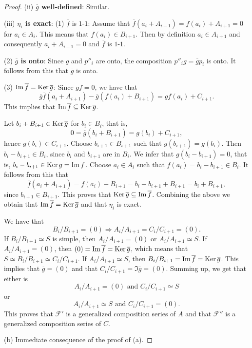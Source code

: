\begin{proof}
(ii) \textbf{$\overline{g}$ well-defined}: Similar.

(iii) \textbf{$\eta_i$ is exact}: (1) $\overline{f}$ is $1$-$1$:
Assume that $\overline{f}(a_i+A_{i+1}) = f(a_i) + A_{i+1} =0$ for
$a_i\in A_i$. This means that $f(a_i)\in B_{i+1}$.  Then by definition
$a_i\in A_{i+1}$ and consequently $a_i+A_{i+1} = 0$ and $\overline{f}$
is $1$-$1$.

(2) \textbf{$\overline{g}$ is onto}: Since $g$ and $p''_i$ are onto,
the composition $p''_ig = \overline{g}p_i$ is onto.  It follows from
this that $\overline{g}$ is onto.

(3) $\operatorname{Im}\nolimits \overline{f} = \operatorname{Ker}\nolimits \overline{g}$: Since $gf=0$, we have that
\[\overline{g}\overline{f}(a_i+A_{i+1}) - \overline{g}(f(a_i)+B_{i+1})
    = gf(a_i) + C_{i+1}.\]
  This implies that $\operatorname{Im}\nolimits \overline{f} \subseteq \operatorname{Ker}\nolimits \overline{g}$.

  Let $b_i +B_{i+1} \in \operatorname{Ker}\nolimits \overline{g}$ for $b_i\in B_i$, that is,
  \[0 = \overline{g}(b_i + B_{i+1}) = g(b_i) + C_{i+1},\]
  hence $g(b_i)\in C_{i+1}$.  Choose $b_{i+1}\in B_{i+1}$ such that
  $g(b_{i+1}) = g(b_i)$.  Then $b_i - b_{i+1} \in B_i$, since $b_i$
  and $b_{i+1}$ are in $B_i$.  We infer that $g(b_i - b_{i+1}) = 0$,
  that is, $b_i - b_{i+1}\in \operatorname{Ker}\nolimits g = \operatorname{Im}\nolimits f$.  Choose $a_i\in A_i$
  such that $f(a_i) = b_i - b_{i+1}\in B_i$.  It follows from this
  that
  \[\overline{f}(a_i + A_{i+1}) = f(a_i) + B_{i+1} = b_i - b_{i+1} +
    B_{i+1} = b_i + B_{i+1},\]
  since $b_{i+1}\in B_{i+1}$.  This proves that $\operatorname{Ker}\nolimits \overline{g}
  \subseteq \operatorname{Im}\nolimits \overline{f}$. Combining the above we obtain that $\operatorname{Im}\nolimits
  \overline{f} = \operatorname{Ker}\nolimits \overline{g}$ and that $\eta_i$ is exact.

  We have that
  \[B_i/B_{i+1} = (0) \Rightarrow A_i/A_{i+1} = C_i/C_{i+1} = (0).\]
  If $B_i/B_{i+1}\simeq S$ is simple, then $A_i/A_{i+1} = (0)$ or $A_i/A_{i+1}
  \simeq S$.  If $A_i/A_{i+1} = (0)$, then $(0) = \operatorname{Im}\nolimits \overline{f} =
  \operatorname{Ker}\nolimits \overline{g}$, which means that $S\simeq B_i/B_{i+1} \simeq
  C_i/C_{i+1}$.  If $A_i/A_{i+1} \simeq S$, then $B_i/B_{i+1} = \operatorname{Im}\nolimits \overline{f} =
  \operatorname{Ker}\nolimits \overline{g}$.  This implies that $\overline{g} = (0)$ and that
  $C_i/C_{i+1} = \Im\overline{g} = (0)$.  Summing up, we get that
  either is
  \[A_i/A_{i+1} = (0) \textrm{\ and\ } C_i/C_{i+1} \simeq S\]
  or
  \[A_i/A_{i+1} \simeq S \textrm{\ and\ } C_i/C_{i+1} = (0).\]
This proves that $\mathscr{F}'$ is a generalized composition series of
$A$ and that $\mathscr{F}''$ is a generalized composition series of
$C$.

(b) Immediate consequence of the proof of (a).
\end{proof}

